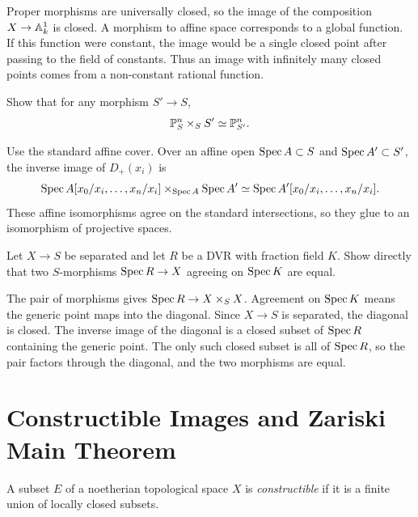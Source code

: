 \begin{solution}
Proper morphisms are universally closed, so the image of the composition
\(X\to\AA^1_k\) is closed.  A morphism to affine space corresponds to a global
function.  If this function were constant, the image would be a single closed
point after passing to the field of constants.  Thus an image with infinitely
many closed points comes from a non-constant rational function.
\end{solution}

\begin{exercise}\label{ex:base-change-pn}
Show that for any morphism \(S'\to S\),
\[
    \PP^n_S\times_S S'\simeq \PP^n_{S'}.
\]
\end{exercise}

\begin{solution}
Use the standard affine cover.  Over an affine open \(\Spec A\subset S\) and
\(\Spec A'\subset S'\), the inverse image of \(D_+(x_i)\) is
\[
    \Spec A[x_0/x_i,\ldots,x_n/x_i]\times_{\Spec A}\Spec A'
    \simeq
    \Spec A'[x_0/x_i,\ldots,x_n/x_i].
\]
These affine isomorphisms agree on the standard intersections, so they glue to
an isomorphism of projective spaces.
\end{solution}

\begin{exercise}\label{ex:valuative-separated}
Let \(X\to S\) be separated and let \(R\) be a DVR with fraction field \(K\).
Show directly that two \(S\)-morphisms \(\Spec R\to X\) agreeing on
\(\Spec K\) are equal.
\end{exercise}

\begin{solution}
The pair of morphisms gives \(\Spec R\to X\times_S X\).  Agreement on
\(\Spec K\) means the generic point maps into the diagonal.  Since \(X\to S\)
is separated, the diagonal is closed.  The inverse image of the diagonal is a
closed subset of \(\Spec R\) containing the generic point.  The only such
closed subset is all of \(\Spec R\), so the pair factors through the diagonal,
and the two morphisms are equal.
\end{solution}

\section{Constructible Images and Zariski Main Theorem}

\begin{definition}
A subset \(E\) of a noetherian topological space \(X\) is \emph{constructible}
if it is a finite union of locally closed subsets.
\end{definition}

